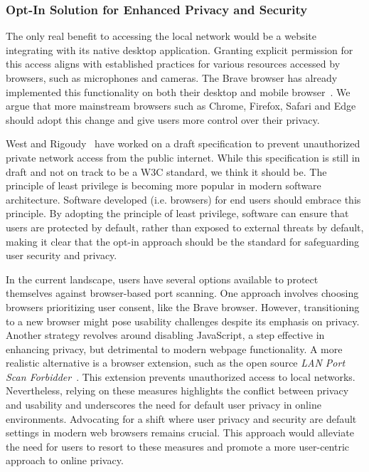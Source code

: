 \subsubsection{Opt-In Solution for Enhanced Privacy and Security}

The only real benefit to accessing the local network would be a website integrating with its native desktop application. 
Granting explicit permission for this access aligns with established practices for various resources accessed by browsers, such as microphones and cameras.
The Brave browser has already implemented this functionality on both their desktop and mobile browser~. 
We argue that more mainstream browsers such as Chrome, Firefox, Safari and Edge should adopt this change and give users more control over their privacy. 

West and Rigoudy~ have worked on a draft specification to prevent unauthorized private network access from the public internet. 
While this specification is still in draft and not on track to be a W3C standard, we think it should be. 
The principle of least privilege is becoming more popular in modern software architecture. 
Software developed (i.e. browsers) for end users should embrace this principle. 
By adopting the principle of least privilege, software can ensure that users are protected by default, rather than exposed to external threats by default, making it clear that the opt-in approach should be the standard for safeguarding user security and privacy.

In the current landscape, users have several options available to protect themselves against browser-based port scanning. 
One approach involves choosing browsers prioritizing user consent, like the Brave browser. 
However, transitioning to a new browser might pose usability challenges despite its emphasis on privacy.
Another strategy revolves around disabling JavaScript, a step effective in enhancing privacy, but detrimental to modern webpage functionality.
A more realistic alternative is a browser extension, such as the open source \emph{LAN Port Scan Forbidder}~. 
This extension prevents unauthorized access to local networks. 
Nevertheless, relying on these measures highlights the conflict between privacy and usability and underscores the need for default user privacy in online environments.
Advocating for a shift where user privacy and security are default settings in modern web browsers remains crucial. 
This approach would alleviate the need for users to resort to these measures and promote a more user-centric approach to online privacy.

